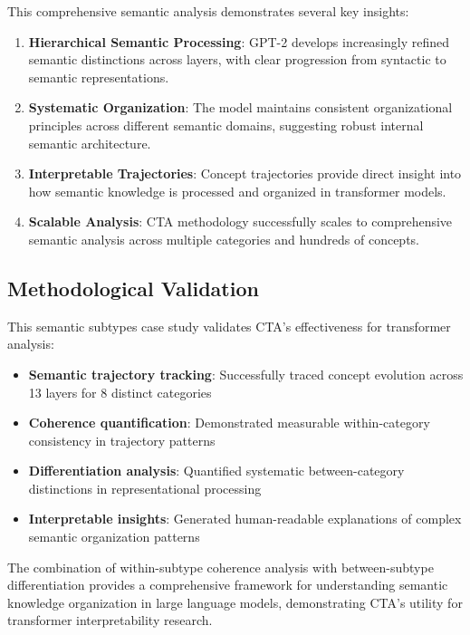 This comprehensive semantic analysis demonstrates several key insights:

\begin{enumerate}
    \item \textbf{Hierarchical Semantic Processing}: GPT-2 develops increasingly refined semantic distinctions across layers, with clear progression from syntactic to semantic representations.
    
    \item \textbf{Systematic Organization}: The model maintains consistent organizational principles across different semantic domains, suggesting robust internal semantic architecture.
    
    \item \textbf{Interpretable Trajectories}: Concept trajectories provide direct insight into how semantic knowledge is processed and organized in transformer models.
    
    \item \textbf{Scalable Analysis}: CTA methodology successfully scales to comprehensive semantic analysis across multiple categories and hundreds of concepts.
\end{enumerate}

\subsection{Methodological Validation}

This semantic subtypes case study validates CTA's effectiveness for transformer analysis:

\begin{itemize}
    \item \textbf{Semantic trajectory tracking}: Successfully traced concept evolution across 13 layers for 8 distinct categories
    \item \textbf{Coherence quantification}: Demonstrated measurable within-category consistency in trajectory patterns
    \item \textbf{Differentiation analysis}: Quantified systematic between-category distinctions in representational processing
    \item \textbf{Interpretable insights}: Generated human-readable explanations of complex semantic organization patterns
\end{itemize}

The combination of within-subtype coherence analysis with between-subtype differentiation provides a comprehensive framework for understanding semantic knowledge organization in large language models, demonstrating CTA's utility for transformer interpretability research.